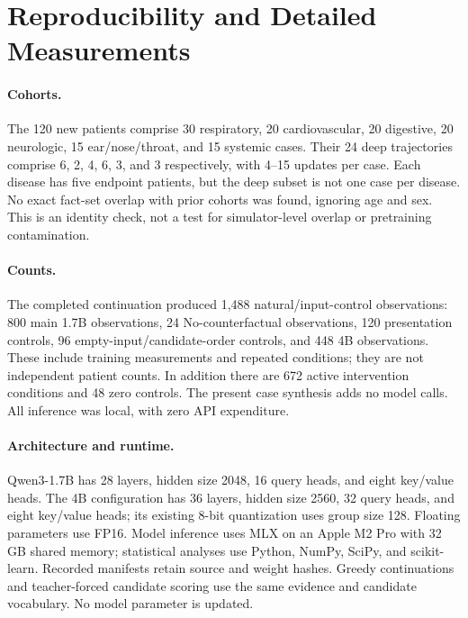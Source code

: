 \section{Reproducibility and Detailed Measurements}\label{app:repro}
\paragraph{Cohorts.} The 120 new patients comprise 30 respiratory, 20 cardiovascular, 20 digestive, 20 neurologic, 15 ear/nose/throat, and 15 systemic cases. Their 24 deep trajectories comprise 6, 2, 4, 6, 3, and 3 respectively, with 4--15 updates per case. Each disease has five endpoint patients, but the deep subset is not one case per disease. No exact fact-set overlap with prior cohorts was found, ignoring age and sex. This is an identity check, not a test for simulator-level overlap or pretraining contamination.

\paragraph{Counts.} The completed continuation produced 1,488 natural/input-control observations: 800 main 1.7B observations, 24 No-counterfactual observations, 120 presentation controls, 96 empty-input/candidate-order controls, and 448 4B observations. These include training measurements and repeated conditions; they are not independent patient counts. In addition there are 672 active intervention conditions and 48 zero controls. The present case synthesis adds no model calls. All inference was local, with zero API expenditure.

\paragraph{Architecture and runtime.} Qwen3-1.7B has 28 layers, hidden size 2048, 16 query heads, and eight key/value heads. The 4B configuration has 36 layers, hidden size 2560, 32 query heads, and eight key/value heads; its existing 8-bit quantization uses group size 128. Floating parameters use FP16. Model inference uses MLX on an Apple M2 Pro with 32 GB shared memory; statistical analyses use Python, NumPy, SciPy, and scikit-learn. Recorded manifests retain source and weight hashes. Greedy continuations and teacher-forced candidate scoring use the same evidence and candidate vocabulary. No model parameter is updated.

